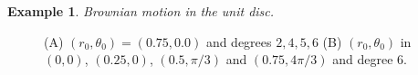 \documentclass[12pt]{amsart}
\theoremstyle{definition}
\newtheorem{examplex}[lemma]{Example}
\begin{document}
\begin{examplex} {\it Brownian motion in the unit disc.}
\begin{figure}
    \centering
    \caption{(A) $(r_0,\theta_0)=(0.75,0.0)$ and degrees $2,4,5,6$ (B) $(r_0,\theta_0)$ in $(0,0)$, $(0.25,0)$, $(0.5,\pi/3)$ and $(0.75,4\pi/3)$ and degree $6$.}
    \label{fig: exit_loc_densities_SOS}
\end{figure}


\end{examplex}
\end{document}
